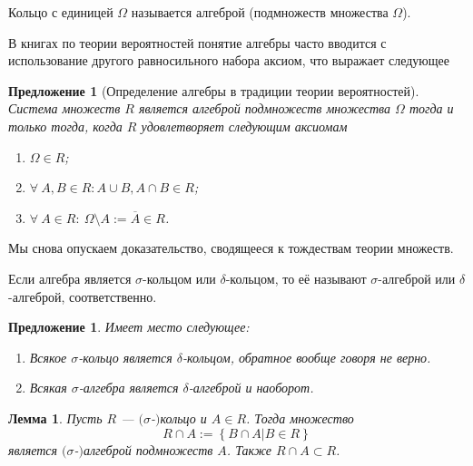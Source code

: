 \documentclass[12pt]{article}
\newtheorem{proposition}[theorem]{Предложение}
\newtheorem{lemma}[theorem]{Лемма}
\numberwithin{theorem}{section}
\theoremstyle{definition}
\newcommand{\defin}[2]{\hypertarget{#2}{{\color{red} #1}}}
\newcommand{\defineset}[2]{\left\{
	\left.
	#1
	\right\vert
	#2
	\right\}}
\begin{document}
	Кольцо с единицей $ \Omega $ называется \defin{алгеброй (подмножеств множества $ \Omega $)}{unit}.
	
	В книгах по теории вероятностей понятие алгебры часто вводится с использование другого равносильного набора аксиом,
	что выражает следующее
	
	\begin{proposition}[Определение алгебры в традиции теории вероятностей]
		Система множеств $ R $ является алгеброй подмножеств множества $ \Omega $
		тогда и только тогда, когда $ R $ удовлетворяет следующим аксиомам
		\begin{enumerate}
			\item $ \Omega \in R $;
			\item $ \forall \ A, B \in R: A \cup B, A \cap B \in R $;
			\item $ \forall \ A \in R: \ \Omega \setminus A := \overline{A} \in R $.
		\end{enumerate}
	\end{proposition}
	Мы снова опускаем доказательство, сводящееся к тождествам теории множеств.
	
	Если алгебра является $ \sigma $-кольцом или $ \delta $-кольцом, 
	то её называют \defin{$ \sigma $-алгеброй}{sigma-algebra} или \defin{$ \delta $-алгеброй}{delta-algebra}, соответственно.
	
	\begin{proposition}
		Имеет место следующее:
		\begin{enumerate}
			\item Всякое $ \sigma $-кольцо является $ \delta $-кольцом,
			обратное вообще говоря не верно.
			\item Всякая $ \sigma $-алгебра является $ \delta $-алгеброй
			и наоборот.
		\end{enumerate}
	\end{proposition}
	 
	\begin{lemma} \label{ring restriction}
		Пусть $ R $ --- $ ( $$ \sigma $-$ ) $кольцо и $ A \in R $.
		Тогда множество $$ R \cap A := \defineset{B \cap A}{B \in R} $$ является $ ( $$ \sigma $-$ ) $алгеброй
		подмножеств $ A $. Также $ R \cap A \subset R $.
	\end{lemma}
	
\end{document}
